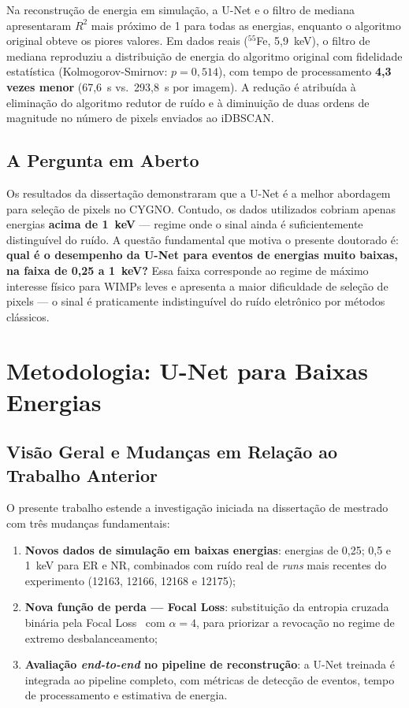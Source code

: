 \documentclass[
       oneside,
       english,
       brazil
       ]{abntbibufjf}
\begin{document}
Na reconstrução de energia em simulação, a U-Net e o filtro de mediana
apresentaram $R^2$ mais próximo de 1 para todas as energias, enquanto o
algoritmo original obteve os piores valores. Em dados reais ($^{55}$Fe,
5,9~keV), o filtro de mediana reproduziu a distribuição de energia do
algoritmo original com fidelidade estatística (Kolmogorov-Smirnov:
$p = 0{,}514$), com tempo de processamento \textbf{4,3 vezes menor}
(67,6~s vs.\ 293,8~s por imagem). A redução é atribuída à eliminação do
algoritmo redutor de ruído e à diminuição de duas ordens de magnitude no
número de pixels enviados ao iDBSCAN.

\section{A Pergunta em Aberto}
\label{sec:dissertation_conclusion}

Os resultados da dissertação demonstraram que a U-Net é a melhor abordagem
para seleção de pixels no CYGNO. Contudo, os dados utilizados cobriam apenas
energias \textbf{acima de 1~keV} — regime onde o sinal ainda é
suficientemente distinguível do ruído. A questão fundamental que motiva o
presente doutorado é: \textbf{qual é o desempenho da U-Net para eventos de
energias muito baixas, na faixa de 0,25 a 1~keV?} Essa faixa corresponde ao
regime de máximo interesse físico para WIMPs leves e apresenta a maior
dificuldade de seleção de pixels — o sinal é praticamente indistinguível do
ruído eletrônico por métodos clássicos.


\chapter{Metodologia: U-Net para Baixas Energias}
\label{chap:methodology}

\section{Visão Geral e Mudanças em Relação ao Trabalho Anterior}
\label{sec:changes}

O presente trabalho estende a investigação iniciada na dissertação de mestrado
com três mudanças fundamentais:
\begin{enumerate}
    \item \textbf{Novos dados de simulação em baixas energias}: energias de
    0,25; 0,5 e 1~keV para ER e NR, combinados com ruído real de
    \textit{runs} mais recentes do experimento (12163, 12166, 12168 e 12175);
    \item \textbf{Nova função de perda — Focal Loss}: substituição da
    entropia cruzada binária pela Focal Loss~\cite{lin2017focal} com
    $\alpha = 4$, para priorizar a revocação no regime de extremo
    desbalanceamento;
    \item \textbf{Avaliação \textit{end-to-end} no pipeline de reconstrução}:
    a U-Net treinada é integrada ao pipeline completo, com métricas de
    detecção de eventos, tempo de processamento e estimativa de energia.
\end{enumerate}
\end{document}

